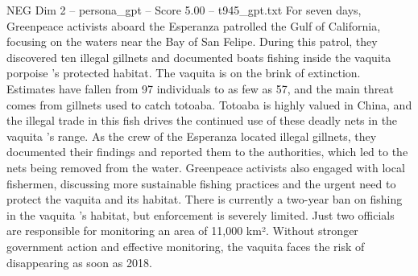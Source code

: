 \begin{textsample}{NEG Dim 2 – persona\_gpt – Score 5.00 – t945\_gpt.txt}  \label{ex:f2_neg_049}
For seven days, Greenpeace activists aboard the Esperanza patrolled the Gulf of California, focusing on the waters near the Bay of San Felipe.
During this patrol, they discovered ten illegal gillnets and documented boats fishing inside the vaquita porpoise ’s protected habitat.
The vaquita is on the brink of extinction.
Estimates have fallen from 97 individuals to as few as 57, and the main threat comes from gillnets used to catch totoaba.
Totoaba is highly valued in China, and the illegal trade in this fish drives the continued use of these deadly nets in the vaquita ’s range.
As the crew of the Esperanza located illegal gillnets, they documented their findings and reported them to the authorities, which led to the nets being removed from the water.
Greenpeace activists also engaged with local fishermen, discussing more sustainable fishing practices and the urgent need to protect the vaquita and its habitat.
There is currently a two-year ban on fishing in the vaquita ’s habitat, but enforcement is severely limited.
Just two officials are responsible for monitoring an area of 11,000 km².
Without stronger government action and effective monitoring, the vaquita faces the risk of disappearing as soon as 2018.

\end{textsample}
